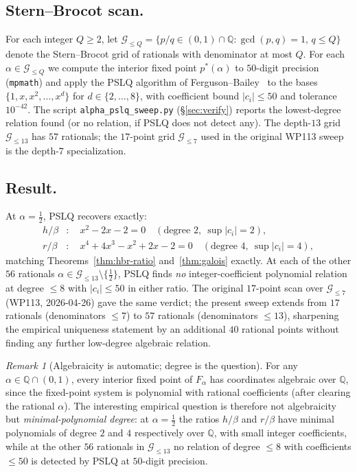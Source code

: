 \documentclass[11pt,reqno]{amsart}
\theoremstyle{plain}
\theoremstyle{definition}
\theoremstyle{remark}
\newtheorem*{remark}{Remark}
\newcommand{\Q}{\mathbb{Q}}
\begin{document}
\subsection{Stern--Brocot scan.}
For each integer $Q\ge 2$, let
$\mathcal{G}_{\le Q} = \{p/q\in(0,1)\cap\Q : \gcd(p, q) = 1,\, q\le Q\}$
denote the Stern--Brocot grid of rationals with denominator at most
$Q$. For each $\alpha\in\mathcal{G}_{\le Q}$ we compute the interior
fixed point $p^{*}(\alpha)$ to $50$-digit precision (\texttt{mpmath})
and apply the PSLQ algorithm of Ferguson--Bailey~\cite{FergusonBailey1999}
to the bases $\{1, x, x^{2}, \dots, x^{d}\}$ for $d\in\{2,\dots,8\}$,
with coefficient bound $|c_{i}|\le 50$ and tolerance $10^{-42}$. The
script \texttt{alpha\_pslq\_sweep.py} (\S\ref{sec:verify}) reports the
lowest-degree relation found (or no relation, if PSLQ does not detect
any). The depth-$13$ grid $\mathcal{G}_{\le 13}$ has $57$ rationals;
the $17$-point grid $\mathcal{G}_{\le 7}$ used in the original WP113
sweep is the depth-$7$ specialization.

\subsection{Result.}
At $\alpha = \tfrac12$, PSLQ recovers exactly:
\begin{align*}
  h/\beta &: \quad x^{2} - 2x - 2 = 0 \quad
    (\text{degree }2,\ \sup|c_{i}| = 2),\\
  r/\beta &: \quad x^{4} + 4x^{3} - x^{2} + 2x - 2 = 0 \quad
    (\text{degree }4,\ \sup|c_{i}| = 4),
\end{align*}
matching Theorems~\ref{thm:hbr-ratio} and~\ref{thm:galois}
exactly. At each of the other $56$ rationals
$\alpha\in\mathcal{G}_{\le 13}\setminus\{\tfrac12\}$, PSLQ finds
\emph{no} integer-coefficient polynomial relation at degree
$\le 8$ with $|c_{i}| \le 50$ in either ratio. The original
$17$-point scan over $\mathcal{G}_{\le 7}$ (WP113, 2026-04-26) gave
the same verdict; the present sweep extends from $17$ rationals
(denominators $\le 7$) to $57$ rationals (denominators $\le 13$),
sharpening the empirical uniqueness statement by an additional $40$
rational points without finding any further low-degree algebraic
relation.

\begin{remark}[Algebraicity is automatic; degree is the question]
\label{rem:degree-bounded}
For any $\alpha\in\Q\cap(0, 1)$, every interior fixed point of
$F_{\alpha}$ has coordinates algebraic over $\Q$, since the
fixed-point system is polynomial with rational coefficients
(after clearing the rational $\alpha$). The interesting empirical
question is therefore not algebraicity but \emph{minimal-polynomial
degree}: at $\alpha = \tfrac12$ the ratios $h/\beta$ and $r/\beta$
have minimal polynomials of degree $2$ and $4$ respectively over
$\Q$, with small integer coefficients, while at the other $56$
rationals in $\mathcal{G}_{\le 13}$ no relation of degree $\le 8$
with coefficients $\le 50$ is detected by PSLQ at $50$-digit
precision.
\end{remark}
\end{document}
